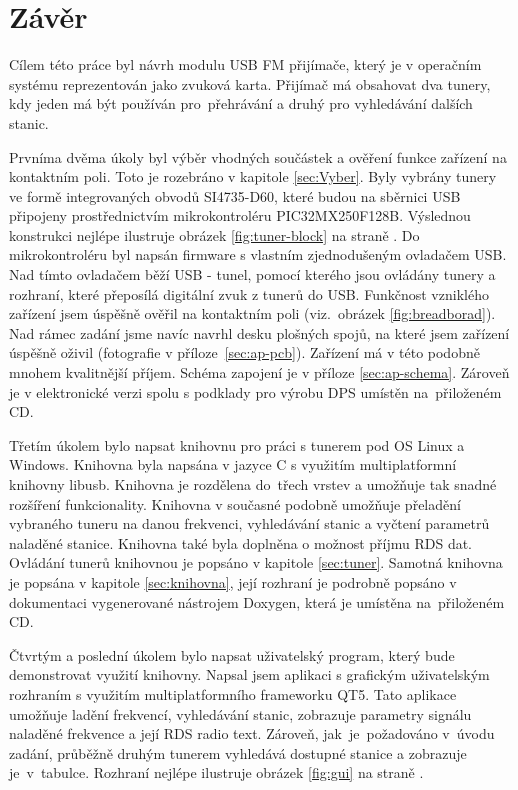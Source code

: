 \section{Závěr}
\label{sec:Conclusion}


Cílem této práce byl návrh modulu USB FM přijímače, který je v operačním systému reprezentován jako zvuková karta. Přijímač má obsahovat dva tunery, kdy jeden má být používán pro~přehrávání a druhý pro vyhledávání dalších stanic. 

Prvníma dvěma úkoly byl výběr vhodných součástek a ověření funkce zařízení na kontaktním poli. Toto je rozebráno v kapitole \ref{sec:Vyber}. Byly vybrány tunery ve formě integrovaných obvodů SI4735-D60, které budou na sběrnici USB připojeny prostřednictvím mikrokontroléru PIC32MX250F128B. Výslednou konstrukci nejlépe ilustruje obrázek \ref{fig:tuner-block} na straně \pageref{fig:tuner-block}. Do mikrokontroléru byl napsán firmware s vlastním zjednodušeným ovladačem USB. Nad tímto ovladačem běží USB - \iic tunel, pomocí kterého jsou ovládány tunery a rozhraní, které přeposílá digitální zvuk z tunerů do USB. Funkčnost vzniklého zařízení jsem úspěšně ověřil na kontaktním poli (viz.~obrázek \ref{fig:breadborad}). Nad rámec zadání jsme navíc navrhl  desku plošných spojů, na které jsem zařízení úspěšně oživil (fotografie v příloze~\ref{sec:ap-pcb}). Zařízení má v této podobně mnohem kvalitnější příjem. Schéma zapojení je v příloze \ref{sec:ap-schema}. Zároveň je v elektronické verzi spolu s podklady pro výrobu DPS umístěn na~přiloženém CD.

Třetím úkolem bylo napsat knihovnu pro práci s tunerem pod OS Linux a Windows. Knihovna byla napsána v jazyce C s využitím multiplatformní knihovny libusb. Knihovna je rozdělena do~třech vrstev a umožňuje tak snadné rozšíření funkcionality. Knihovna v současné podobně umožňuje přeladění vybraného tuneru na danou frekvenci, vyhledávání stanic a vyčtení parametrů naladěné stanice. Knihovna také byla doplněna o možnost příjmu RDS dat. Ovládání tunerů knihovnou je popsáno v kapitole \ref{sec:tuner}. Samotná knihovna je popsána v kapitole \ref{sec:knihovna}, její rozhraní je podrobně popsáno v dokumentaci vygenerované nástrojem Doxygen, která je umístěna na~přiloženém CD.

Čtvrtým a poslední úkolem bylo napsat uživatelský program, který bude demonstrovat využití knihovny. Napsal jsem aplikaci s grafickým uživatelským rozhraním s využitím multiplatformního frameworku QT5. Tato aplikace umožňuje ladění frekvencí, vyhledávání stanic, zobrazuje parametry signálu naladěné frekvence a její RDS radio text. Zároveň, jak~je~požadováno v~úvodu zadání, průběžně druhým tunerem vyhledává dostupné stanice a zobrazuje je~v~tabulce. Rozhraní nejlépe ilustruje obrázek \ref{fig:gui} na straně \pageref{fig:gui}.

